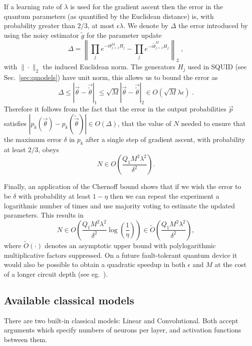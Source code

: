 If a learning rate of $\lambda$ is used for the gradient ascent then the error in the quantum parameters (as quantified by the Euclidean distance) is, with probability greater than $2/3$, at most $\epsilon\lambda$.  We denote by $\Delta$ the error introduced by using the noisy estimator $\widetilde{g}$ for the parameter update
\begin{equation}
\Delta = \left\|\prod_j e^{-i \theta_{j=1}^M H_j} - \prod_j e^{-i \widetilde{\theta}_{j=1}^M H_j}\right\|_2\;,
\end{equation}
with $\|\cdot \|_2$ the induced Euclidean norm.
The generators $H_j$ used in SQUID (see Sec.~\ref{sec:qmodels}) have unit norm, this allows us to bound the error as
\begin{equation}
\Delta \le | \vec{\theta} - \vec{\widetilde{\theta}}|_1 \le \sqrt{M} | \vec{\theta} - \vec{\widetilde{\theta}}|_2 \in O\left({ \sqrt{M} \lambda \epsilon}\right)\;.
\end{equation}
Therefore it follows from the fact that the error in the output probabilities $\vec{p}$ satisfies $|p_k(\vec{\theta}) - p_k(\widetilde{\vec{\theta}})| \in O(\Delta)$, that the value of $N$ needed to ensure that the maximum error $\delta$ in $p_k$ after a single step of gradient ascent, with probability at least $2/3$, obeys
\begin{equation}
N \in O\left(\frac{Q_1 M^2 \lambda^2}{\delta^2} \right).
\end{equation}

Finally, an application of the Chernoff bound shows that if we wish the error to be $\delta$ with probability at least $1-\eta$ then we can repeat the experiment a logarithmic number of times and use majority voting to estimate the updated parameters.  This results in
\begin{equation}
N \in O\left(\frac{Q_1 M^2 \lambda^2}{\delta^2}\log\left(\frac{1}{\eta} \right) \right) \in \widetilde{O}\left(\frac{Q_1 M^2 \lambda^2}{\delta^2} \right),
\end{equation}
where $\widetilde{O}(\cdot)$ denotes an asymptotic upper bound with polylogarithmic multiplicative factors suppressed.
On a future fault-tolerant quantum device it would also be possible to obtain a quadratic speedup in both $\epsilon$ and $M$ at the cost of a longer circuit depth (see eg.~\cite{Brassard_2002,gilyen2019optimizing}).

\subsection{Available classical models}
There are two built-in classical models: Linear and Convolutional. Both accept arguments which specify numbers of neurons per layer, and activation functions between them.

